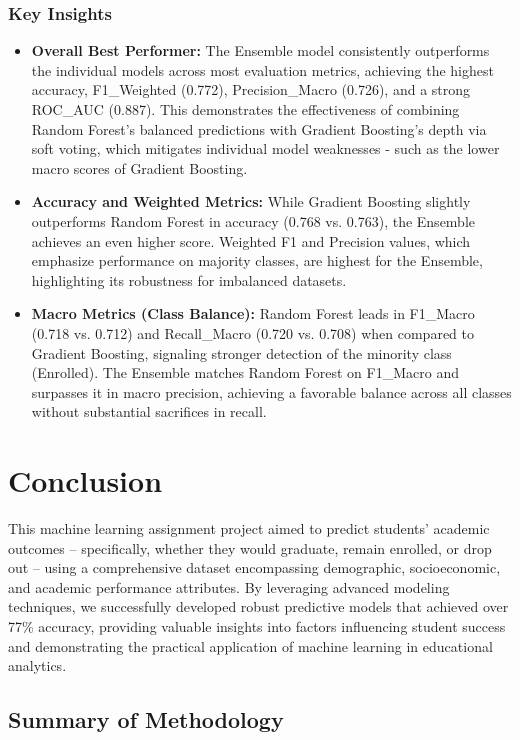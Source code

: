\documentclass[twoside,final]{hcmut-report}
\begin{document}
\subsubsection*{Key Insights}
\begin{itemize}
  \item \textbf{Overall Best Performer:} The Ensemble model consistently outperforms the individual models across most evaluation metrics, achieving the highest accuracy, F1\_Weighted (0.772), Precision\_Macro (0.726), and a strong ROC\_AUC (0.887). This demonstrates the effectiveness of combining Random Forest's balanced predictions with Gradient Boosting's depth via soft voting, which mitigates individual model weaknesses - such as the lower macro scores of Gradient Boosting.
  \item \textbf{Accuracy and Weighted Metrics:} While Gradient Boosting slightly outperforms Random Forest in accuracy (0.768 vs. 0.763), the Ensemble achieves an even higher score. Weighted F1 and Precision values, which emphasize performance on majority classes, are highest for the Ensemble, highlighting its robustness for imbalanced datasets.
  \item \textbf{Macro Metrics (Class Balance):} Random Forest leads in F1\_Macro (0.718 vs. 0.712) and Recall\_Macro (0.720 vs. 0.708) when compared to Gradient Boosting, signaling stronger detection of the minority class (Enrolled). The Ensemble matches Random Forest on F1\_Macro and surpasses it in macro precision, achieving a favorable balance across all classes without substantial sacrifices in recall.
\end{itemize}

\section{Conclusion}
This machine learning assignment project aimed to predict students' academic outcomes -- specifically, whether they would graduate, remain enrolled, or drop out -- using a comprehensive dataset encompassing demographic, socioeconomic, and academic performance attributes. By leveraging advanced modeling techniques, we successfully developed robust predictive models that achieved over 77\% accuracy, providing valuable insights into factors influencing student success and demonstrating the practical application of machine learning in educational analytics.

\subsection{Summary of Methodology}
\end{document}
